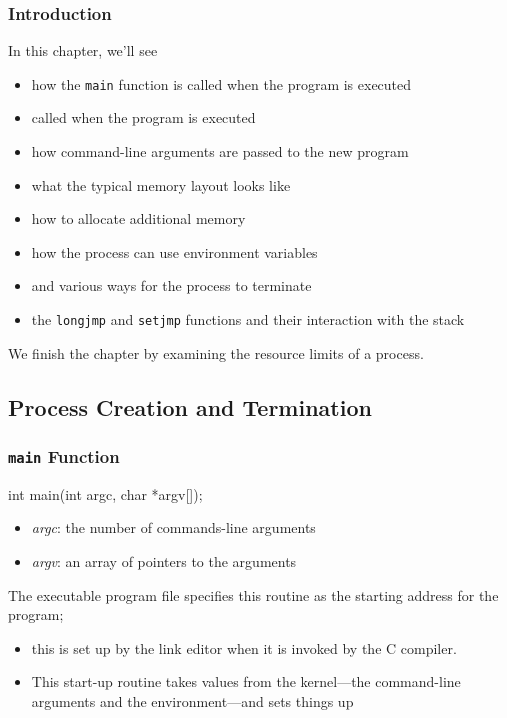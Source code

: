 \documentclass[newPxFont,sthlmFooter,nooffset]{beamer}
\begin{document}
\begin{frame}[t]
  \frametitle{Introduction}
In this chapter, we'll see
\begin{itemize}
\item how the \texttt{main} function is called when the program is executed
\item called when the program is executed
\item how command-line arguments are passed to the new program
\item what the typical memory layout looks like
\item how to allocate additional memory
\item how the process can use environment variables
\item and various ways for the process to terminate
\item the \texttt{longjmp} and \texttt{setjmp} functions and their interaction with the stack
\end{itemize}
We finish the chapter by examining the resource limits of a process.
\end{frame}



\subsection{Process Creation and Termination }

\begin{frame}[containsverbatim,t]
  \frametitle{\texttt{main} Function}
\begin{codedef}
int main(int argc, char *argv[]);
\end{codedef}
\begin{itemize}
\item \textit{argc}: the number of commands-line arguments
\item \textit{argv}: an array of pointers to the arguments
\end{itemize}

The executable program file specifies this routine as the starting address for the program;
\begin{itemize}
\item this is set up by the link editor when it is invoked by the C
  compiler.
\item This start-up routine takes values from the kernel---the
  command-line arguments and the environment---and sets things up 
\end{itemize}

\end{frame}
\end{document}
